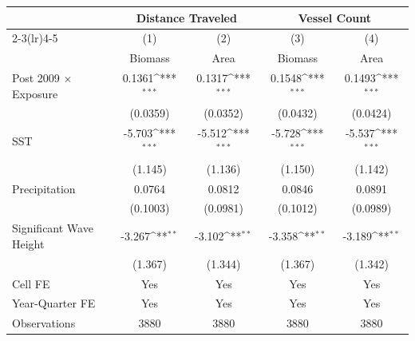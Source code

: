 \def\sym#1{\ifmmode^{#1}\else\(^{#1}\)\fi}
\begin{tabular}{l*{4}{c}}
\hline\hline
                    &\multicolumn{2}{c}{Distance Traveled}&\multicolumn{2}{c}{Vessel Count}\\
                    \cmidrule(lr){2-3}\cmidrule(lr){4-5}
                    &\multicolumn{1}{c}{(1)}&\multicolumn{1}{c}{(2)}&\multicolumn{1}{c}{(3)}&\multicolumn{1}{c}{(4)}\\
                    &\multicolumn{1}{c}{Biomass}&\multicolumn{1}{c}{Area}&\multicolumn{1}{c}{Biomass}&\multicolumn{1}{c}{Area}\\
\hline
Post 2009 $\times$ Exposure&     0.1361\sym{***}&     0.1317\sym{***}&     0.1548\sym{***}&     0.1493\sym{***}\\
                    &             (0.0359)&             (0.0352)&             (0.0432)&             (0.0424)\\
[1em]
SST                 &     -5.703\sym{***}&     -5.512\sym{***}&     -5.728\sym{***}&     -5.537\sym{***}\\
                    &              (1.145)&              (1.136)&              (1.150)&              (1.142)\\
[1em]
Precipitation       &     0.0764&     0.0812&     0.0846&     0.0891\\
                    &             (0.1003)&             (0.0981)&             (0.1012)&             (0.0989)\\
[1em]
Significant Wave Height&     -3.267\sym{**}&     -3.102\sym{**}&     -3.358\sym{**}&     -3.189\sym{**}\\
                    &              (1.367)&              (1.344)&              (1.367)&              (1.342)\\
[1em]
\hline
Cell FE             &         Yes         &         Yes         &         Yes         &         Yes         \\
Year-Quarter FE     &         Yes         &         Yes         &         Yes         &         Yes         \\
Observations        &        3880         &        3880         &        3880         &        3880         \\
\hline\hline
\end{tabular}